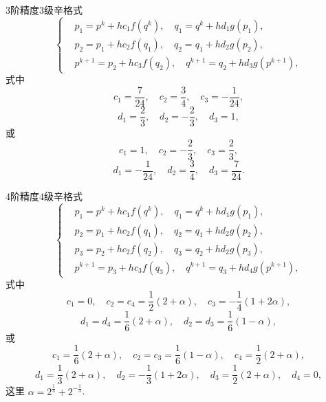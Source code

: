 $3$阶精度$3$级辛格式
\begin{equation*}
	\left\lbrace \begin{aligned}
		&p_1=p^{k}+hc_1f(q^{k}),\quad q_1=q^{k}+hd_1g(p_1),\\
		&p_2=p_1+hc_2f(q_1),\quad q_2=q_1+hd_2g(p_2),\\
		&p^{k+1}=p_2+hc_3f(q_2),\quad q^{k+1}=q_2+hd_3g(p^{k+1}),
	\end{aligned}\right.
\end{equation*}
式中
\begin{equation*}
	c_1=\frac{7}{24},\quad c_2=\frac{3}{4},\quad c_3=-\frac{1}{24},
\end{equation*}
\begin{equation*}
	d_1=\frac{2}{3},\quad d_2=-\frac{2}{3},\quad d_3=1,
\end{equation*}
或
\begin{equation*}
	c_1=1,\quad c_2=-\frac{2}{3},\quad c_3=\frac{2}{3},
\end{equation*}
\begin{equation*}
	d_1=-\frac{1}{24},\quad d_2=\frac{3}{4},\quad d_3=\frac{7}{24}.
\end{equation*}

$4$阶精度$4$级辛格式
\begin{equation*}
	\left\lbrace \begin{aligned}
		&p_1=p^{k}+hc_1f(q^{k}),\quad q_1=q^{k}+hd_1g(p_1),\\
		&p_2=p_1+hc_2f(q_1),\quad q_2=q_1+hd_2g(p_2),\\
		&p_3=p_2+hc_2f(q_2),\quad q_3=q_2+hd_2g(p_3),\\
		&p^{k+1}=p_3+hc_3f(q_3),\quad q^{k+1}=q_3+hd_4g(p^{k+1}),
	\end{aligned}\right.
\end{equation*}
式中
\begin{equation*}
	c_1=0,\quad c_2=c_4=\frac{1}{2}(2+\alpha),\quad c_3=-\frac{1}{4}(1+2\alpha),
\end{equation*}
\begin{equation*}
	d_1=d_4=\frac{1}{6}(2+\alpha),\quad d_2=d_3=\frac{1}{6}(1-\alpha),
\end{equation*}
或
\begin{equation*}
	c_1=\frac{1}{6}(2+\alpha),\quad c_2=c_3=\frac{1}{6}(1-\alpha),\quad c_4=\frac{1}{2}(2+\alpha),
\end{equation*}
\begin{equation*}
	d_1=\frac{1}{3}(2+\alpha),\quad d_2=-\frac{1}{3}(1+2\alpha),\quad d_3=\frac{1}{2}(2+\alpha),\quad d_4=0,
\end{equation*}
这里 $\alpha = 2^{\frac{1}{3}}+2^{-\frac{1}{3}}$.

